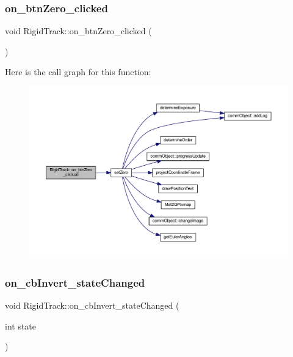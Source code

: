 \subsubsection{\texorpdfstring{on\+\_\+btn\+Zero\+\_\+clicked}{on\_btnZero\_clicked}}
{\footnotesize\ttfamily void Rigid\+Track\+::on\+\_\+btn\+Zero\+\_\+clicked (\begin{DoxyParamCaption}{ }\end{DoxyParamCaption})\hspace{0.3cm}{\ttfamily [slot]}}

Here is the call graph for this function\+:\nopagebreak
\begin{figure}[H]
\begin{center}
\leavevmode
\includegraphics[width=350pt]{class_rigid_track_afb1a4edcacc818db4ec6bb017dd07e0f_cgraph}
\end{center}
\end{figure}
\mbox{\label{class_rigid_track_ab347b3edeca55685f4d601549596d44a}} 
\subsubsection{\texorpdfstring{on\+\_\+cb\+Invert\+\_\+state\+Changed}{on\_cbInvert\_stateChanged}}
{\footnotesize\ttfamily void Rigid\+Track\+::on\+\_\+cb\+Invert\+\_\+state\+Changed (\begin{DoxyParamCaption}\item[{int}]{state }\end{DoxyParamCaption})\hspace{0.3cm}{\ttfamily [slot]}}

